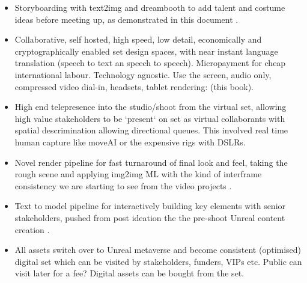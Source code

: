 \begin{itemize}
\item Storyboarding with text2img and dreambooth to add talent and costume ideas before meeting up, as demonstrated in this document \cite{ruiz2022dreambooth}.
\item Collaborative, self hosted, high speed, low detail, economically and cryptographically enabled set design spaces, with near instant language translation (speech to text an speech to speech). Micropayment for cheap international labour. Technology agnostic. Use the screen, audio only, compressed video dial-in, headsets, tablet rendering: (this book).
\item High end telepresence \cite{Roberts2015, OHare2018, Fairchild2017, OHare2016} into the studio/shoot from the virtual set, allowing high value stakeholders to be `present` on set as virtual collaborants with spatial descrimination allowing directional queues. This involved real time human capture like moveAI or the expensive rigs with DSLRs.
\item Novel render pipeline for fast turnaround of final look and feel, taking the rough scene and applying img2img ML with the kind of interframe consistency we are starting to see from the video projects \cite{anonymous2023phenaki}.
\item Text to model pipeline for interactively building key elements with senior stakeholders, pushed from post ideation the the  pre-shoot Unreal content creation \cite{poole2022dreamfusion}.
\item All assets switch over to Unreal metaverse and become consistent (optimised) digital set which can be visited by stakeholders, funders, VIPs etc. Public can visit later for a fee? Digital assets can be bought from the set.
\end{itemize}

